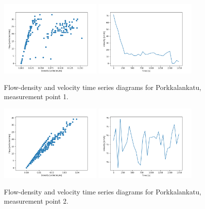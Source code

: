 \documentclass[english, 12pt, a4paper, elec, utf8, pdfa, online]{aaltothesis}
\begin{document}
\clearpage
\begin{figure}[ht!]
    \centering
    \includegraphics[width=0.45\textwidth]{graphs/Porkkalankatu_1_flw_dns.png}
    \includegraphics[width=0.45\textwidth]{graphs/Porkkalankatu_1_spd_time_6.png}
    \caption{Flow-density and velocity time series diagrams for Porkkalankatu, measurement point 1.}
\end{figure}
\begin{figure}[ht!]
    \centering
    \includegraphics[width=0.45\textwidth]{graphs/Porkkalankatu_2_flw_dns.png}
    \includegraphics[width=0.45\textwidth]{graphs/Porkkalankatu_2_spd_time_6.png}
    \caption{Flow-density and velocity time series diagrams for Porkkalankatu, measurement point 2.}
\end{figure}
\end{document}
